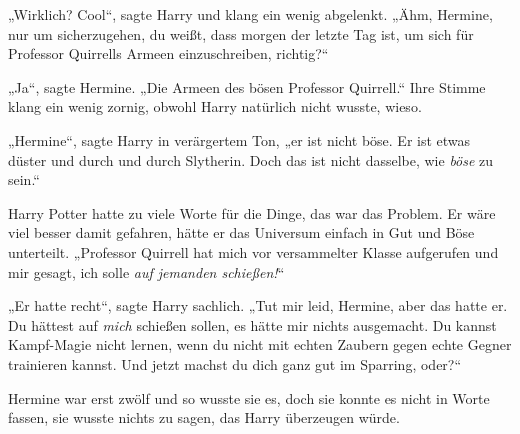 „Wirklich? Cool“, sagte Harry und klang ein wenig abgelenkt. „Ähm, Hermine, nur um sicherzugehen, du weißt, dass morgen der letzte Tag ist, um sich für Professor Quirrells Armeen einzuschreiben, richtig?“

„Ja“, sagte Hermine. „Die Armeen des bösen Professor Quirrell.“ Ihre Stimme klang ein wenig zornig, obwohl Harry natürlich nicht wusste, wieso.

„Hermine“, sagte Harry in verärgertem Ton, „er ist nicht böse. Er ist etwas düster und durch und durch Slytherin. Doch das ist nicht dasselbe, wie \emph{böse} zu sein.“

Harry Potter hatte zu viele Worte für die Dinge, das war das Problem. Er wäre viel besser damit gefahren, hätte er das Universum einfach in Gut und Böse unterteilt. „Professor Quirrell hat mich vor versammelter Klasse aufgerufen und mir gesagt, ich solle \emph{auf jemanden schießen!}“

„Er hatte recht“, sagte Harry sachlich. „Tut mir leid, Hermine, aber das hatte er. Du hättest auf \emph{mich} schießen sollen, es hätte mir nichts ausgemacht. Du kannst Kampf-Magie nicht lernen, wenn du nicht mit echten Zaubern gegen echte Gegner trainieren kannst. Und jetzt machst du dich ganz gut im Sparring, oder?“

Hermine war erst zwölf und so wusste sie es, doch sie konnte es nicht in Worte fassen, sie wusste nichts zu sagen, das Harry überzeugen würde.

